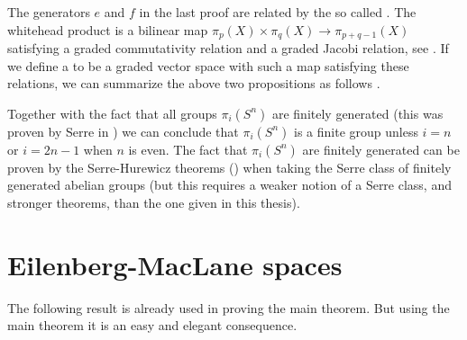 The generators $e$ and $f$ in the last proof are related by the so called . The whitehead product is a bilinear map $\pi_p(X) \times \pi_q(X) \to \pi_{p+q-1}(X)$ satisfying a graded commutativity relation and a graded Jacobi relation, see \cite{felix}. If we define a  to be a graded vector space with such a map satisfying these relations, we can summarize the above two propositions as follows \cite{berglund}.


Together with the fact that all groups $\pi_i(S^n)$ are finitely generated (this was proven by Serre in \cite{serre}) we can conclude that $\pi_i(S^n)$ is a finite group unless $i=n$ or $i=2n-1$ when $n$ is even. The fact that $\pi_i(S^n)$ are finitely generated can be proven by the Serre-Hurewicz theorems () when taking the Serre class of finitely generated abelian groups (but this requires a weaker notion of a Serre class, and stronger theorems, than the one given in this thesis).


\section{Eilenberg-MacLane spaces}

The following result is already used in proving the main theorem. But using the main theorem it is an easy and elegant consequence.



